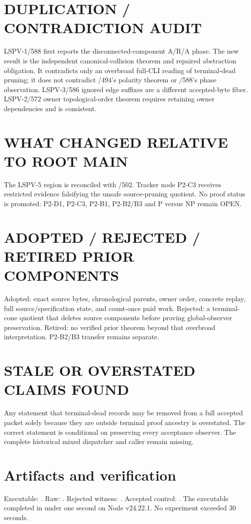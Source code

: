 \documentclass[11pt]{article}
\begin{document}
\section*{DUPLICATION / CONTRADICTION AUDIT}
LSPV-1/588 first reports the disconnected-component A/R/A phase.
The new result is the independent canonical-collision theorem and repaired abstraction obligation.
It contradicts only an overbroad full-CLI reading of terminal-dead pruning; it does not contradict /494's polarity theorem or /588's phase observation.
LSPV-3/586 ignored edge suffixes are a different accepted-byte fiber.
LSPV-2/572 owner topological-order theorem requires retaining owner dependencies and is consistent.

\section*{WHAT CHANGED RELATIVE TO ROOT MAIN}
The LSPV-5 region is reconciled with /502.
Tracker node P2-C3 receives restricted evidence falsifying the unsafe source-pruning quotient.
No proof status is promoted: P2-D1, P2-C3, P2-B1, P2-B2/B3 and P versus NP remain OPEN.

\section*{ADOPTED / REJECTED / RETIRED PRIOR COMPONENTS}
Adopted: exact source bytes, chronological parents, owner order, concrete replay, full source/specification state, and count-once paid work.
Rejected: a terminal-cone quotient that deletes source components before proving global-observer preservation.
Retired: no verified prior theorem beyond that overbroad interpretation.
P2-B2/B3 transfer remains separate.

\section*{STALE OR OVERSTATED CLAIMS FOUND}
Any statement that terminal-dead records may be removed from a full accepted packet solely because they are outside terminal proof ancestry is overstated.
The correct statement is conditional on preserving every acceptance observer.
The complete historical mixed dispatcher and caller remain missing.

\section*{Artifacts and verification}
Executable: .
Raw: .
Rejected witness: .
Accepted control: .
The executable completed in under one second on Node v24.22.1.
No experiment exceeded 30 seconds.
\end{document}
